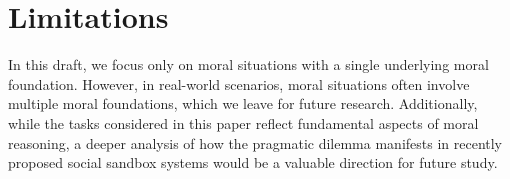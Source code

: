 \section*{Limitations}
In this draft, we focus only on moral situations with a single underlying moral foundation. However, in real-world scenarios, moral situations often involve multiple moral foundations, which we leave for future research.
Additionally, while the tasks considered in this paper reflect fundamental aspects of moral reasoning, a deeper analysis of how the pragmatic dilemma manifests in recently proposed social sandbox systems would be a valuable direction for future study.
